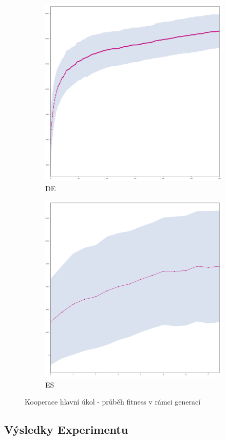 	\begin{figure}[p]
		\centering
		\begin{subfigure}{.5\textwidth}
			\centering
			\includegraphics[width=\linewidth]{../img/WoodMap/DE/graph_of_WoodCoopMem-mean.png}
			\caption{DE}
			\label{obr04:CoopDE}
		\end{subfigure}%
		\begin{subfigure}{.5\textwidth}
			\centering
			\includegraphics[width=\linewidth]{../img/WoodMap/ES/WoodCoopES-mean.png}
			\caption{ES}
			\label{obr04:CoopES}
		\end{subfigure}
		\caption{Kooperace  hlavní úkol  - průběh fitness v rámci generací}
		\label{obr04:Coop}
	\end{figure}
	\clearpage
\subsection{Výsledky Experimentu}


